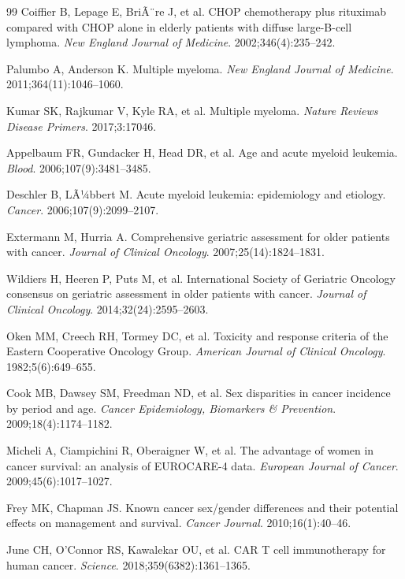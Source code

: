 ﻿\documentclass[12pt,a4paper]{article}
\theoremstyle{definition}
\begin{document}
\begin{thebibliography}{99}
  Coiffier B, Lepage E, BriÃ¨re J, et al.
  CHOP chemotherapy plus rituximab compared with CHOP alone in elderly patients
  with diffuse large-B-cell lymphoma.
  \textit{New England Journal of Medicine}. 2002;346(4):235--242.

  Palumbo A, Anderson K.
  Multiple myeloma.
  \textit{New England Journal of Medicine}. 2011;364(11):1046--1060.

  Kumar SK, Rajkumar V, Kyle RA, et al.
  Multiple myeloma.
  \textit{Nature Reviews Disease Primers}. 2017;3:17046.

  Appelbaum FR, Gundacker H, Head DR, et al.
  Age and acute myeloid leukemia.
  \textit{Blood}. 2006;107(9):3481--3485.

  Deschler B, LÃ¼bbert M.
  Acute myeloid leukemia: epidemiology and etiology.
  \textit{Cancer}. 2006;107(9):2099--2107.

  Extermann M, Hurria A.
  Comprehensive geriatric assessment for older patients with cancer.
  \textit{Journal of Clinical Oncology}. 2007;25(14):1824--1831.

  Wildiers H, Heeren P, Puts M, et al.
  International Society of Geriatric Oncology consensus on geriatric assessment
  in older patients with cancer.
  \textit{Journal of Clinical Oncology}. 2014;32(24):2595--2603.

  Oken MM, Creech RH, Tormey DC, et al.
  Toxicity and response criteria of the Eastern Cooperative Oncology Group.
  \textit{American Journal of Clinical Oncology}. 1982;5(6):649--655.

  Cook MB, Dawsey SM, Freedman ND, et al.
  Sex disparities in cancer incidence by period and age.
  \textit{Cancer Epidemiology, Biomarkers \& Prevention}. 2009;18(4):1174--1182.

  Micheli A, Ciampichini R, Oberaigner W, et al.
  The advantage of women in cancer survival: an analysis of EUROCARE-4 data.
  \textit{European Journal of Cancer}. 2009;45(6):1017--1027.

  Frey MK, Chapman JS.
  Known cancer sex/gender differences and their potential effects on management
  and survival.
  \textit{Cancer Journal}. 2010;16(1):40--46.

  June CH, O'Connor RS, Kawalekar OU, et al.
  CAR T cell immunotherapy for human cancer.
  \textit{Science}. 2018;359(6382):1361--1365.


\end{thebibliography}
\end{document}
